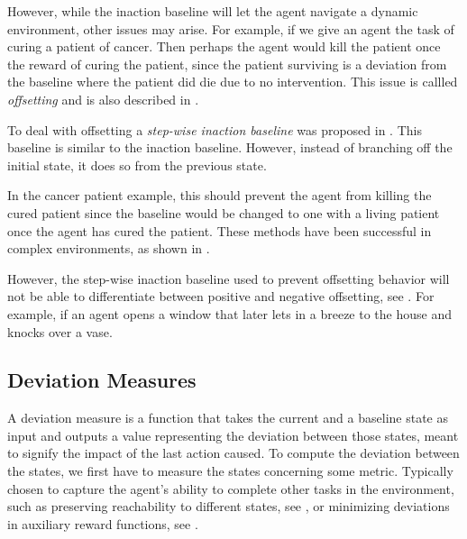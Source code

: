 \documentclass[12pt,A4]{report}
\theoremstyle{definition}
\begin{document}
However, while the inaction baseline will let the agent navigate a dynamic environment, other issues may arise. For example, if we give an agent the task of curing a patient of cancer. Then perhaps the agent would kill the patient once the reward of curing the patient, since the patient surviving is a deviation from the baseline where the patient did die due to no intervention. This issue is callled \textit{offsetting} and is also described in \citet{Krakovna19}.

To deal with offsetting a \textit{step-wise inaction baseline} was proposed in \citet{Krakovna19}. This baseline is similar to the inaction baseline. However, instead of branching off the initial state, it does so from the previous state.

In the cancer patient example, this should prevent the agent from killing the cured patient since the baseline would be changed to one with a living patient once the agent has cured the patient. These methods have been successful in complex environments, as shown in \citet{Turner20}. 

However, the step-wise inaction baseline used to prevent offsetting behavior will not be able to differentiate between positive and negative offsetting, see \citet{Krakovna20}. For example, if an agent opens a window that later lets in a breeze to the house and knocks over a vase. 


\subsection{Deviation Measures}
A deviation measure is a function that takes the current and a baseline state as input and outputs a value representing the deviation between those states, meant to signify the impact of the last action caused. To compute the deviation between the states, we first have to measure the states concerning some metric. Typically chosen to capture the agent's ability to complete other tasks in the environment, such as preserving reachability to different states, see \citet{Krakovna19}, or minimizing deviations in auxiliary reward functions, see \citet{Turner19}. 
\end{document}
